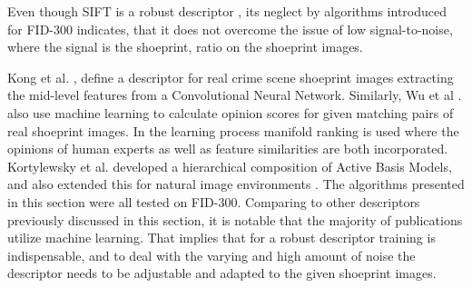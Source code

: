 \documentclass[draft,final]{vutinfth} %
\begin{document}
Even though SIFT is a robust descriptor  \cite{lowe1999object}, its neglect by algorithms introduced for FID-300 indicates, that it does not overcome the issue of low signal-to-noise, where the signal is the shoeprint, ratio on the shoeprint images.
\par
Kong et al. \cite{kong2017cross}, \cite{kong2019cross} define a descriptor for real crime scene shoeprint images extracting the mid-level features from a Convolutional Neural Network.
Similarly, Wu et al .\cite{wu2019losgsr} also use machine learning to calculate opinion scores for given matching pairs of real shoeprint images.
In the learning process manifold ranking is used where the opinions of human experts as well as feature similarities are both incorporated.
Kortylewsky et al. \cite{kortylewski2016probabilistic} developed a hierarchical composition of Active Basis Models, and also extended this for natural image environments \cite{kortylewski2019greedy}.
The algorithms presented in this section were all tested on FID-300.
Comparing to other descriptors previously discussed in this section, it is notable that the majority of publications utilize machine learning.
That implies that for a robust descriptor training is indispensable, and to deal with the varying and high amount of noise the descriptor needs to be adjustable and adapted to the given shoeprint images.
\end{document}
